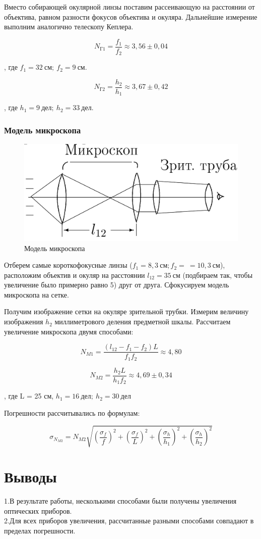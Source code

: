 \documentclass[a4paper,12pt]{article}
\begin{document}
Вместо собирающей окулярной линзы поставим рассеивающую на расстоянии от объектива, равном разности фокусов объектива и окуляра. Дальнейшие измерение выполним аналогично телескопу Кеплера.

$$
N_{Г1} = \frac{f_1}{f_2} \approx 3,56 \pm  0,04
$$

, где $f_1 = 32 \ см; \ f_2 = 9 \ см $.


$$
N_{Г2} = \frac{h_2}{h_1} \approx 3,67 \pm 0,42
$$

, где $h_1 = 9 \ дел; \ h_2 = 33 \ дел$.


\subsubsection*{Модель микроскопа}

\begin{figure} 
	\includegraphics[width=\linewidth]{fig4}
	\caption{Модель микроскопа}
	\label{microscope}
\end{figure}

Отберем самые короткофокусные линзы ($f_1 = 8,3 \ см; f_2 = \ =10,3 \ см$), расположим объектив и окуляр на расстоянии $l_{12} = 35 \ см$ (подбираем так, чтобы увеличение было примерно равно 5) друг от друга. Сфокусируем модель микроскопа на сетке.

Получим изображение сетки на окуляре зрительной трубки. Измерим величину изображения $h_2$ миллиметрового деления предметной шкалы. Рассчитаем увеличение микроскопа двумя способами:

$$
N_{M1} = \frac{(l_{12}-f_1-f_2)L}{f_1 f_2} \approx 4,80
$$

$$
N_{M2} = \frac{h_2 L}{h_1 f_2} \approx 4,69 \pm 0,34
$$

, где L = 25 см, $h_1 = 16 \ дел; \ h_2 = 30 \ дел$

Погрешности рассчитывались по формулам:

$$
\sigma_{N_{M2}} = N_{M2} \sqrt{ \left(\frac{ \sigma_f}{f}\right)^2 + \left(\frac{ \sigma_f}{L}\right)^2 + \left(\frac{ \sigma_h}{h_1}\right)^2 + \left(\frac{ \sigma_h}{h_2}\right)^2 }
$$

\section*{Выводы}
1.В результате работы, несколькими способами были получены увеличения оптических приборов. \\
2.Для всех приборов увеличения, рассчитанные разными способами совпадают в пределах погрешности.
\end{document}
